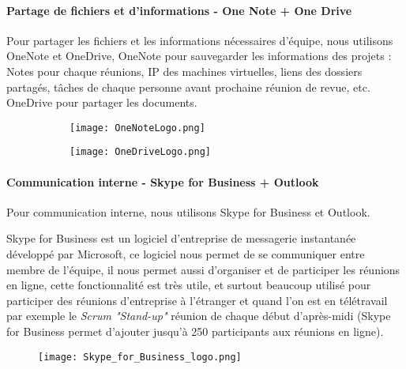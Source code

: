         
        \paragraph{Partage de fichiers et d'informations - One Note + One Drive }
        Pour partager les fichiers et les informations nécessaires d'équipe, nous utilisons OneNote et OneDrive, OneNote pour sauvegarder les informations des projets : Notes pour chaque réunions, IP des machines virtuelles, liens des dossiers partagés, tâches de chaque personne avant prochaine réunion de revue, etc. OneDrive pour partager les documents.
        
        \begin{figure}[H]
            \flushleft
            \begin{subfigure}[b]{.2\textwidth}
                \texttt{[image: OneNoteLogo.png]}
            \end{subfigure}
            \begin{subfigure}[b]{.2\textwidth}
                \texttt{[image: OneDriveLogo.png]}
            \end{subfigure}
            \label{fig:oneNote_oneDrive_label}
        \end{figure}
        
        \paragraph{Communication interne - Skype for Business + Outlook}
        Pour communication interne, nous utilisons Skype for Business et Outlook.
        
        \par Skype for Business est un logiciel d'entreprise de messagerie instantanée développé par Microsoft, ce logiciel nous permet de se communiquer entre membre de l'équipe, il nous permet aussi d'organiser et de participer les réunions en ligne, cette fonctionnalité est très utile, et surtout beaucoup utilisé pour participer des réunions d'entreprise à l'étranger et quand l'on est en télétravail par exemple le \textit{Scrum "Stand-up"} réunion de chaque début d'après-midi (Skype for Business permet d'ajouter jusqu'à 250 participants aux réunions en ligne).
        \begin{figure}[H]
            \flushleft
            \texttt{[image: Skype\_for\_Business\_logo.png]}
            \label{skype_lable}
        \end{figure}
        
